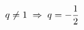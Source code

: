 \documentclass[preview]{standalone}
\begin{document}
\begin{align*}
\special{dvisvgm:raw <g id='unique000'>}q\neq1 \;\Rightarrow\; q=-\frac{1}{2}\special{dvisvgm:raw </g>}
\end{align*}
\end{document}
